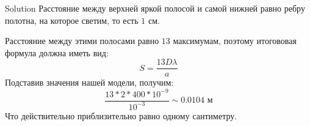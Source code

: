 \documentclass{beamer}
\begin{document}
\begin{frame}{Solution}
  Расстояние между верхней яркой полосой и самой нижней равно ребру полотна, на которое светим, то есть $1$ см.

  \pause
  Расстояние между этими полосами равно $13$ максимумам, поэтому итогововая формула должна иметь вид:
  \[
    S = \frac{13D\lambda}{a}
  \]
  \pause
  Подставив значения нашей модели, получим:
  \[
    \frac{13 * 2 * 400 * 10^{-9}}{10^{-3}} \sim 0.0104\text{ м}
  \]
  Что действительно приблизительно равно одному сантиметру.
\end{frame}
  
\end{document}
